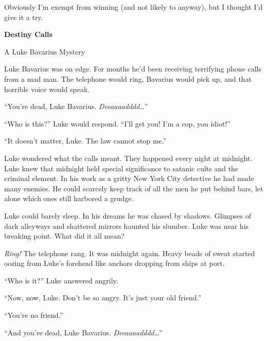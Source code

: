  





Obviously I'm exempt from winning (and not likely to anyway), but I
thought I'd give it a try.



{\bf Destiny Calls

A Luke Bavarius Mystery}



Luke Bavarius was on edge. For months he'd been receiving
terrifying phone calls from a mad man. The telephone would ring,
Bavarius would pick up, and that horrible voice would speak.



``You're dead, Luke Bavarius. {\em Deeaaaadddd{\ldots}}''



``Who is this?'' Luke would respond. ``I'll get you! I'm a cop, you
idiot!''



``It doesn't matter, Luke. The law cannot stop me.''



Luke wondered what the calls meant. They happened every night at
midnight. Luke knew that midnight held special significance to
satanic cults and the criminal element. In his work as a gritty New
York City detective he had made many enemies. He could scarcely
keep track of all the men he put behind bars, let alone which ones
still harbored a grudge.



Luke could barely sleep. In his dreams he was chased by shadows.
Glimpses of dark alleyways and shattered mirrors haunted his
slumber. Luke was near his breaking point. What did it all
mean?



{\em Ring!} The telephone rang. It was midnight again. Heavy beads
of sweat started oozing from Luke's forehead like anchors dropping
from ships at port.



``Who is it?'' Luke answered angrily.



``Now, now, Luke. Don't be so angry. It's just your old
friend.''



``You're no friend.''



``And you're dead, Luke Bavarius. {\em Deeaaaadddd{\ldots}}''




